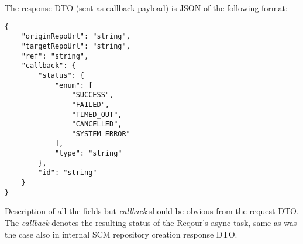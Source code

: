 \documentclass[../main.tex]{subfiles}
\begin{document}
The response DTO (sent as callback payload) is JSON of the following format:
\begin{lstlisting}[numbers=none]
{
    "originRepoUrl": "string",
    "targetRepoUrl": "string",
    "ref": "string",
    "callback": {
        "status": {
            "enum": [
                "SUCCESS",
                "FAILED",
                "TIMED_OUT",
                "CANCELLED",
                "SYSTEM_ERROR"
            ],
            "type": "string"
        },
        "id": "string"
    }
}
\end{lstlisting}

Description of all the fields but \textit{callback} should be obvious from the request DTO. The \textit{callback} denotes the resulting status of the Reqour's async task, same as was the case also in internal SCM repository creation response DTO.
\end{document}
